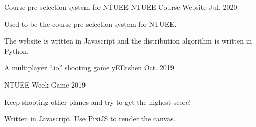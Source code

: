\begin{cventries}
  \cventry
  {Course pre-selection system for NTUEE}
  {NTUEE Course Website \href{https://github.com/NTUEEInfoDep/NTUEECourseWebsite2020}{\color{red}{[Github Link]}}}
  {}
  {Jul. 2020} %
  {
    \begin{cvitems} %
      \item {Used to be the course pre-selection system for NTUEE.}
      \item {The website is written in Javascript and the distribution algorithm is written in Python.}
    \end{cvitems}
  }

  \cventry
  {A multiplayer “.io” shooting game}
  {yEEtshen \href{https://github.com/NTUEEInfoDep/yEEtshen}{\color{red}{[Github Link]}}}
  {}
  {Oct. 2019} %
  {
    \begin{cvitems} %
      \item {NTUEE Week Game 2019}
      \item {Keep shooting other planes and try to get the highest score!}
      \item {Written in Javascript. Use PixiJS to render the canvas.}
    \end{cvitems}
  }
\end{cventries}
